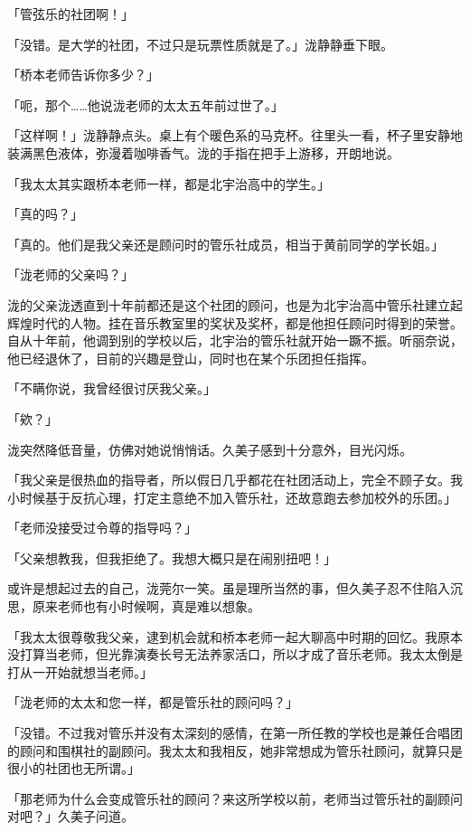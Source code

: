 \documentclass[UTF8]{ctexart}
\begin{document}
    「管弦乐的社团啊！」 

    「没错。是大学的社团，不过只是玩票性质就是了。」泷静静垂下眼。 

    「桥本老师告诉你多少？」 

    「呃，那个……他说泷老师的太太五年前过世了。」 

    「这样啊！」泷静静点头。桌上有个暖色系的马克杯。往里头一看，杯子里安静地装满黑色液体，弥漫着咖啡香气。泷的手指在把手上游移，开朗地说。 

    「我太太其实跟桥本老师一样，都是北宇治高中的学生。」 

    「真的吗？」 

    「真的。他们是我父亲还是顾问时的管乐社成员，相当于黄前同学的学长姐。」 

    「泷老师的父亲吗？」 

    泷的父亲泷透直到十年前都还是这个社团的顾问，也是为北宇治高中管乐社建立起辉煌时代的人物。挂在音乐教室里的奖状及奖杯，都是他担任顾问时得到的荣誉。自从十年前，他调到别的学校以后，北宇治的管乐社就开始一蹶不振。听丽奈说，他已经退休了，目前的兴趣是登山，同时也在某个乐团担任指挥。 

    「不瞒你说，我曾经很讨厌我父亲。」 

    「欸？」 

    泷突然降低音量，仿佛对她说悄悄话。久美子感到十分意外，目光闪烁。 

    「我父亲是很热血的指导者，所以假日几乎都花在社团活动上，完全不顾子女。我小时候基于反抗心理，打定主意绝不加入管乐社，还故意跑去参加校外的乐团。」 

    「老师没接受过令尊的指导吗？」 

    「父亲想教我，但我拒绝了。我想大概只是在闹别扭吧！」 

    或许是想起过去的自己，泷莞尔一笑。虽是理所当然的事，但久美子忍不住陷入沉思，原来老师也有小时候啊，真是难以想象。 

    「我太太很尊敬我父亲，逮到机会就和桥本老师一起大聊高中时期的回忆。我原本没打算当老师，但光靠演奏长号无法养家活口，所以才成了音乐老师。我太太倒是打从一开始就想当老师。」 

    「泷老师的太太和您一样，都是管乐社的顾问吗？」 

    「没错。不过我对管乐并没有太深刻的感情，在第一所任教的学校也是兼任合唱团的顾问和围棋社的副顾问。我太太和我相反，她非常想成为管乐社顾问，就算只是很小的社团也无所谓。」 

    「那老师为什么会变成管乐社的顾问？来这所学校以前，老师当过管乐社的副顾问对吧？」久美子问道。 
\end{document}
